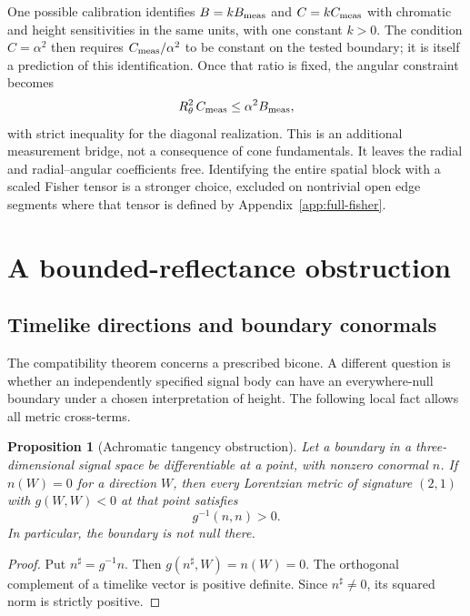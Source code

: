 \documentclass[9pt,twocolumn,twoside]{opticajnl}
\theoremstyle{plain}
\newtheorem{proposition}{Proposition}
\begin{document}
One possible calibration identifies $B=kB_{\rm meas}$ and $C=kC_{\rm meas}$ with chromatic and height sensitivities in the same units, with one constant $k>0$. The condition $C=\alpha^2$ then requires $C_{\rm meas}/\alpha^2$ to be constant on the tested boundary; it is itself a prediction of this identification. Once that ratio is fixed, the angular constraint becomes
\begin{equation}
 R_\theta^2\,C_{\rm meas}\leq\alpha^2 B_{\rm meas},
 \label{eq:relative-calibration}
\end{equation}
with strict inequality for the diagonal realization. This is an additional measurement bridge, not a consequence of cone fundamentals. It leaves the radial and radial--angular coefficients free. Identifying the entire spatial block with a scaled Fisher tensor is a stronger choice, excluded on nontrivial open edge segments where that tensor is defined by Appendix~\ref{app:full-fisher}.

\section{A bounded-reflectance obstruction}
\label{sec:object-obstruction}
\subsection{Timelike directions and boundary conormals}
The compatibility theorem concerns a prescribed bicone. A different question is whether an independently specified signal body can have an everywhere-null boundary under a chosen interpretation of height. The following local fact allows all metric cross-terms.

\begin{proposition}[Achromatic tangency obstruction]
\label{prop:timelike-conormal}
Let a boundary in a three-dimensional signal space be differentiable at a point, with nonzero conormal $n$. If $n(W)=0$ for a direction $W$, then every Lorentzian metric of signature $(2,1)$ with $g(W,W)<0$ at that point satisfies
\begin{equation}
 g^{-1}(n,n)>0.
 \label{eq:timelike-conormal}
\end{equation}
In particular, the boundary is not null there.
\end{proposition}
\begin{proof}
Put $n^\sharp=g^{-1}n$. Then $g(n^\sharp,W)=n(W)=0$. The orthogonal complement of a timelike vector is positive definite. Since $n^\sharp\ne0$, its squared norm is strictly positive.
\end{proof}
\end{document}
